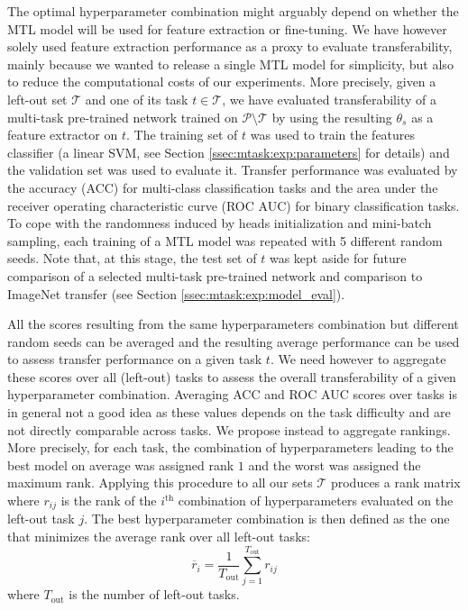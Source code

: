 The optimal hyperparameter combination might arguably depend on whether the MTL model will be used for feature extraction or fine-tuning. We have however solely used feature extraction performance as a proxy to evaluate transferability, mainly because we wanted to release a single MTL model for simplicity, but also to reduce the computational costs of our experiments. More precisely, given a left-out set $\mathcal{T}$ and one of its task $t \in \mathcal{T}$, we have evaluated transferability of a multi-task pre-trained network trained on $\mathcal{P} \setminus \mathcal{T}$ by using the resulting $\theta_s$ as a feature extractor on $t$. The training set of $t$ was used to train the features classifier (\ie a linear SVM, see Section \ref{ssec:mtask:exp:parameters} for details) and the validation set was used to evaluate it. Transfer performance was evaluated by the  accuracy (ACC) for multi-class classification tasks and the area under the receiver operating characteristic curve (ROC AUC) for binary classification tasks. To cope with the randomness induced by heads initialization and mini-batch sampling, each training of a MTL model was repeated with 5 different random seeds. Note that, at this stage, the test set of $t$ was kept aside for future comparison of a selected multi-task pre-trained network and comparison to ImageNet transfer (see Section \ref{ssec:mtask:exp:model_eval}).

All the scores resulting from the same hyperparameters combination but different random seeds can be averaged and the resulting average performance can be used to assess transfer performance on a given task $t$. We need however to aggregate these scores over all (left-out) tasks to assess the overall transferability of a given hyperparameter combination. Averaging ACC and ROC AUC scores over tasks is in general not a good idea as these values depends on the task difficulty and are not directly comparable across tasks. We propose instead to aggregate rankings. More precisely, for each task, the combination of hyperparameters leading to the best model on average was assigned rank $1$ and the worst was assigned the maximum rank. Applying this procedure to all our sets $\mathcal{T}$ produces a rank matrix where $r_{ij}$ is the rank of the $i^{\text{th}}$ combination of hyperparameters evaluated on the left-out task $j$. The best hyperparameter combination is then defined as the one that minimizes the average rank over all left-out tasks:
\begin{equation} \label{eqn:average_ranks}
\overline{r}_i = \dfrac{1}{T_{\text{out}}} \sum^{T_{\text{out}}}_{j = 1} r_{ij}
\end{equation}
where $T_{\text{out}}$ is the number of left-out tasks.

